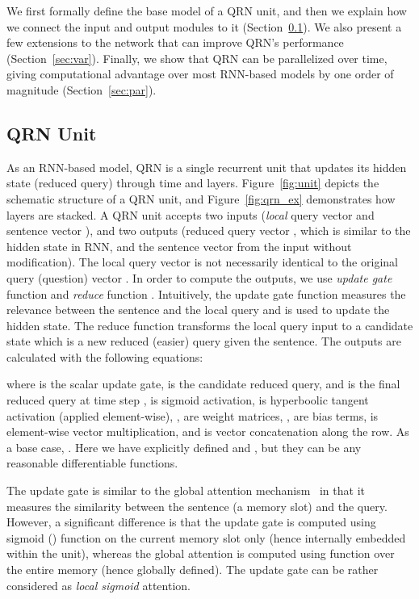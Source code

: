 \documentclass[table]{article}
\begin{document}
We first formally define the base model of a QRN unit, and then we explain how we connect the input and output modules to it (Section~\ref{sec:model}).
We also present a few extensions to the network that can improve QRN's performance (Section~\ref{sec:var}).
Finally, we show that QRN can be parallelized over time, giving computational advantage over most RNN-based models by one order of magnitude (Section~\ref{sec:par}).






\subsection{QRN Unit}\label{sec:model}
As an RNN-based model, QRN is a single recurrent unit that updates its hidden state (reduced query) through time and layers. Figure~\ref{fig:unit} depicts the schematic structure of a QRN unit, and Figure~\ref{fig:qrn_ex} demonstrates how layers are stacked.
A QRN unit accepts two inputs (\emph{local} query vector  and sentence vector ), and two outputs (reduced query vector , which is similar to the hidden state in RNN, and the sentence vector  from the input without modification).
The local query vector is not necessarily identical to the original query (question) vector .
In order to compute the outputs, we use \emph{update gate} function  and \emph{reduce} function . 
Intuitively, the update gate function measures the relevance between the sentence and the local query and is used to update the hidden state. 
The reduce function transforms the local query input to a candidate state which is a new reduced (easier) query given the sentence.
The outputs are calculated with the following equations:

where  is the scalar update gate,  is the candidate reduced query, and  is the final reduced query at time step ,
 is sigmoid activation,  is hyperboolic tangent activation (applied element-wise),
,  are weight matrices, 
,  are bias terms,
 is element-wise vector multiplication, and  is vector concatenation along the row.
As a base case, .
Here we have explicitly defined  and ,
but they can be any reasonable differentiable functions.

The update gate is similar to the global attention mechanism~\citep{memN2N,DMN+} in that it measures the similarity between the sentence (a memory slot) and the query.
However, a significant difference is that the update gate is computed using sigmoid () function on the current memory slot only (hence internally embedded within the unit), whereas the global attention is computed using  function over the entire memory (hence globally defined).
The update gate can be rather considered as \emph{local sigmoid} attention.
\end{document}
